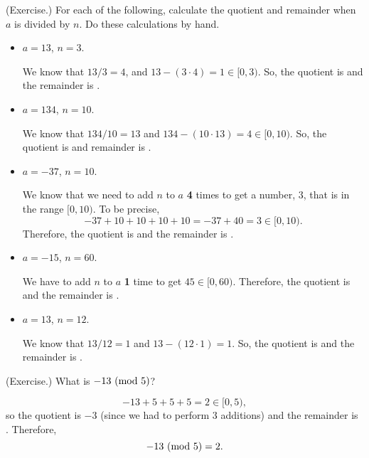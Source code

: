 \documentclass[letterpaper]{article}
\begin{document}
\begin{mdframed}
    (Exercise.) For each of the following, calculate the quotient and remainder when $a$ is divided by $n$. Do these calculations by hand. 
    \begin{itemize}
        \item $a = 13$, $n = 3$.
        \begin{mdframed}
            We know that $13 / 3 = 4$, and $13 - (3 \cdot 4) = 1 \in [0, 3)$. So, the quotient is  and the remainder is . 
        \end{mdframed}
        \item $a = 134$, $n = 10$.
        \begin{mdframed}
            We know that $134 / 10 = 13$ and $134 - (10 \cdot 13) = 4 \in [0, 10)$. So, the quotient is  and remainder is .
        \end{mdframed}
        \item $a = -37$, $n = 10$.
        \begin{mdframed}
            We know that we need to add $n$ to $a$ \textbf{4} times to get a number, $3$, that is in the range $[0, 10)$. To be precise, 
            \[-37 + 10 + 10 + 10 + 10 = -37 + 40 = 3 \in [0, 10).\]
            Therefore, the quotient is  and the remainder is . 
        \end{mdframed}
        \item $a = -15$, $n = 60$.
        \begin{mdframed}
            We have to add $n$ to $a$ \textbf{1} time to get $45 \in [0, 60)$. Therefore, the quotient is  and the remainder is .
        \end{mdframed}
        \item $a = 13$, $n = 12$.
        \begin{mdframed}
            We know that $13 / 12 = 1$ and $13 - (12 \cdot 1) = 1$. So, the quotient is  and the remainder is .
        \end{mdframed}
    \end{itemize}
\end{mdframed}

\begin{mdframed}
    (Exercise.) What is $-13 \ (\mathrm{mod}\ 5)$?
    \begin{mdframed}
        \[-13 + 5 + 5 + 5 = 2 \in [0, 5),\]
        so the quotient is $-3$ (since we had to perform 3 additions) and the remainder is . Therefore, 
        \[-13 \ (\mathrm{mod}\ 5) = 2.\]
    \end{mdframed}
\end{mdframed}
\end{document}

